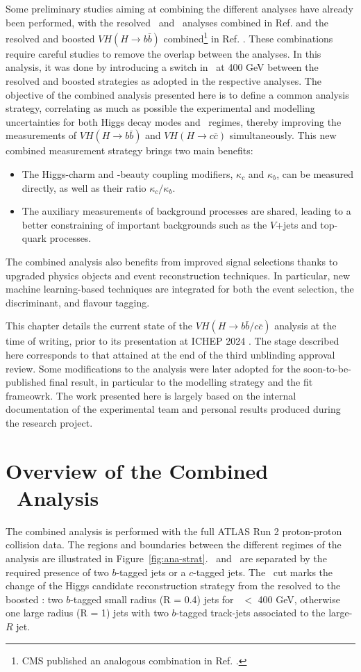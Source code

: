 Some preliminary studies aiming at combining the different analyses have already been performed, with the resolved \vhb\ and \vhc\ analyses combined in Ref. \cite{Collaboration:2721696} and the resolved and boosted $VH (H \rightarrow b\bar{b})$ combined\footnote{CMS published an analogous combination in Ref. \cite{CMS-PAS-HIG-20-001}.} in Ref. \cite{ATLAS:2021wqh}. These combinations require careful studies to remove the overlap between the analyses. In this analysis, it was done by introducing a switch in \ptv\ at 400 GeV between the resolved and boosted strategies as adopted in the respective analyses. The objective of the combined analysis presented here is to define a common analysis strategy, correlating as much as possible the experimental and modelling uncertainties for both Higgs decay modes and \ptv\ regimes, thereby improving the measurements of $VH (H \rightarrow b\bar{b})$ and $VH (H \rightarrow c\bar{c})$ simultaneously. This new combined measurement strategy brings two main benefits: 
\begin{itemize}
\item The Higgs-charm and -beauty coupling modifiers, $\kappa_c$ and $\kappa_b$, can be measured directly, as well as their ratio $\kappa_c/\kappa_b$. 
\item The auxiliary measurements of background processes are shared, leading to a better constraining of important backgrounds such as the $V$+jets and top-quark processes.
\end{itemize}
The combined analysis also benefits from improved signal selections thanks to upgraded physics objects and event reconstruction techniques. In particular, new machine learning-based techniques are integrated for both the event selection, the discriminant, and flavour tagging.

This chapter details the current state of the $VH (H\rightarrow b\bar{b}/c\bar{c})$ analysis at the time of writing, prior to its presentation at ICHEP 2024 \cite{ATLAS-CONF-2024-010}. The stage described here corresponds to that attained at the end of the third unblinding approval review. Some modifications to the analysis were later adopted for the soon-to-be-published final result, in particular to the modelling strategy and the fit frameowrk. The work presented here is largely based on the internal documentation of the experimental team and personal results produced during the research project. 

\section[Overview of the Combined \vhbc\ Analysis]{Overview of the Combined \boldvhbc\ Analysis}
The combined analysis is performed with the full ATLAS Run 2 proton-proton collision data. The regions and boundaries between the different regimes of the analysis are illustrated in Figure~\ref{fig:ana-strat}. \vhb\ and \vhc\ are separated by the required presence of two $b$-tagged jets or a $c$-tagged jets. The \ptv\ cut marks the change of the Higgs candidate reconstruction strategy from the resolved to the boosted \vhb: two $b$-tagged small radius (R = 0.4) jets for \ptv\ $<$ 400 GeV, otherwise one large radius (R = 1) jets with two $b$-tagged track-jets associated to the large-$R$ jet.

